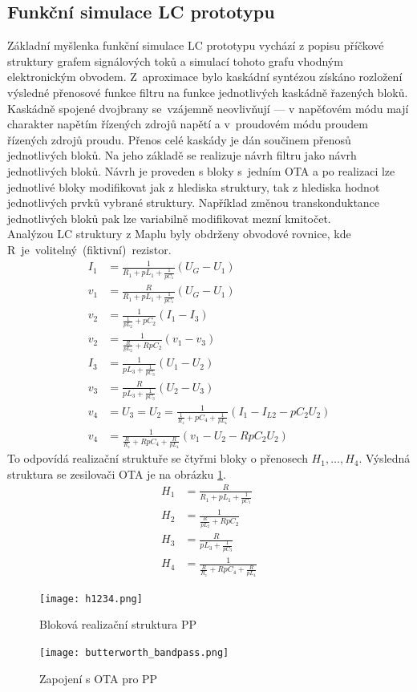 \subsection{Funkční simulace LC prototypu}\label{s:KASK2}
\noindent Základní myšlenka funkční simulace LC prototypu vychází z popisu příčkové struktury grafem signálových toků a simulací tohoto grafu vhodným elektronickým obvodem. Z~aproximace bylo kaskádní syntézou získáno rozložení výsledné přenosové funkce filtru na funkce jednotlivých kaskádně řazených bloků. Kaskádně spojené dvojbrany se~vzájemně neovlivňují --- v napěťovém módu mají charakter napětím řízených zdrojů napětí a v~proudovém módu proudem řízených zdrojů proudu. Přenos celé kaskády je dán součinem přenosů jednotlivých bloků. Na jeho základě se realizuje návrh filtru jako návrh jednotlivých bloků. Návrh je proveden s bloky s~jedním OTA a po realizaci lze jednotlivé bloky modifikovat jak z hlediska struktury, tak z hlediska hodnot jednotlivých prvků vybrané struktury. Například změnou transkonduktance jednotlivých bloků pak lze variabilně modifikovat mezní kmitočet.\\
\newpage
\noindent Analýzou LC struktury z Maplu byly obdrženy obvodové rovnice, kde R~je~volitelný~(fiktivní)~rezistor.
\begin{align}
I_1 &= \frac{1}{R_1 + pL_1 + \frac{1}{pC_1}}(U_G - U_1)\\
v_1 & = \frac{R}{R_1 + pL_1 + \frac{1}{pC_1}}(U_G - U_1)\\
v_2 &= \frac{1}{\frac{1}{pL_2} + pC_2}(I_1 - I_{3})\\
v_2 &= \frac{1}{\frac{R}{pL_2} + RpC_2}(v_1 - v_{3})\\
I_{3} &= \frac{1}{pL_3 + \frac{1}{pC_3}}(U_1 - U_2)\\
v_{3} &= \frac{R}{pL_3 + \frac{1}{pC_3}}(U_2 - U_3)\\
v_4 &= U_3 = U_2 = \frac{1}{\frac{1}{R_z}+pC_4 + \frac{1}{pL_4}}(I_1 - I_{L2} - pC_2U_2)\\
v_4 &= \frac{1}{\frac{R}{R_z}+RpC_4 + \frac{R}{pL_4}}(v_1 - U_2 - RpC_2 U_2)
\end{align}
\noindent To odpovídá realizační struktuře se čtyřmi bloky o přenosech $H_1, \ldots,H_4$. Výsledná struktura se zesilovači OTA je na obrázku \ref{s:OBR}.
\begin{align}
H_1 & = \frac{R}{R_1 + pL_1 + \frac{1}{pC_1}}\\
H_2 &= \frac{1}{\frac{R}{pL_2} + RpC_2}\\
H_3 &= \frac{R}{pL_3 + \frac{1}{pC_3}}\\
H_4 &= \frac{1}{\frac{R}{R_z}+RpC_4 + \frac{R}{pL_4}}
\end{align}
\begin{figure}[h]
\centering
\texttt{[image: h1234.png]}
\caption{Bloková realizační struktura PP}
\end{figure}
\begin{figure}[h]
\centering
\texttt{[image: butterworth\_bandpass.png]}
\caption{Zapojení s OTA pro PP\label{s:OBR}}
\end{figure}
\newpage
